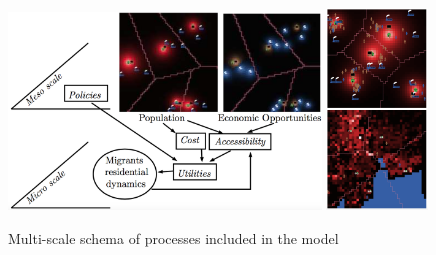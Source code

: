 \begin{figure}[h]
\centering
\includegraphics[width=0.74\textwidth]{figures/model}
\hspace{0.2cm}\vrule
\includegraphics[width=0.24\textwidth]{figures/examples}
\caption{Multi-scale schema of processes included in the model}
\label{fig:model}
\end{figure}


